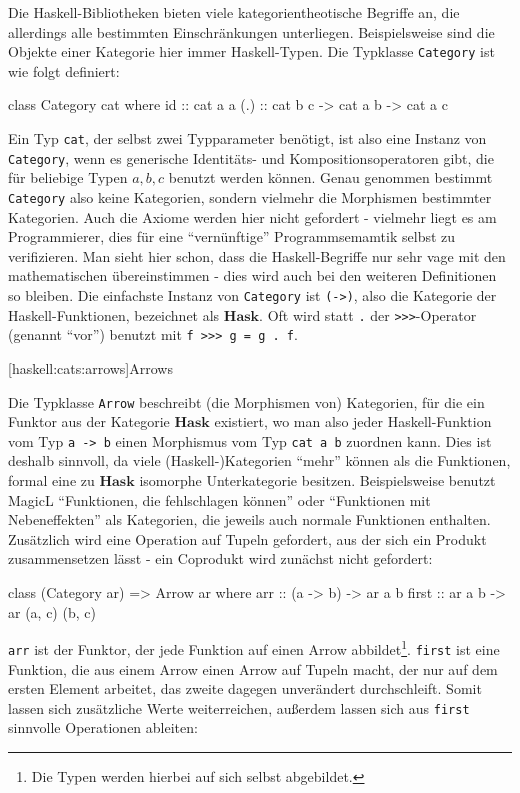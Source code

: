 \documentclass[11pt, a4paper, bibgerm]{scrbook}
\newcommand\icode[1]{\lstinline?#1?}
\newcommand\lsubsection{}
\begin{document}
Die Haskell-Bibliotheken bieten viele kategorientheotische Begriffe an,
die allerdings alle bestimmten Einschränkungen
unterliegen. Beispielsweise sind die Objekte einer Kategorie hier immer
Haskell-Typen. Die Typklasse \icode{Category} ist wie folgt definiert:
\begin{code}
class Category cat where
  id   :: cat a a
  (.)  :: cat b c -> cat a b -> cat a c
\end{code}
Ein Typ \icode{cat}, der selbst zwei Typparameter benötigt, ist also eine
Instanz von \icode{Category}, wenn es generische Identitäts- und
Kompositionsoperatoren gibt, die für beliebige Typen $a,b,c$ benutzt
werden können. Genau genommen bestimmt \icode{Category} also keine
Kategorien, sondern vielmehr die Morphismen bestimmter Kategorien. Auch
die Axiome werden hier nicht gefordert - vielmehr liegt es am
Programmierer, dies für eine "`vernünftige"' Programmsemamtik selbst zu
verifizieren. Man sieht hier schon, dass die Haskell-Begriffe nur sehr
vage mit den mathematischen übereinstimmen - dies wird auch bei den
weiteren Definitionen so bleiben. Die einfachste Instanz von
\icode{Category} ist \icode{(->)}, also die Kategorie der
Haskell-Funktionen, bezeichnet als $\mathbf{Hask}$.
Oft wird statt \icode{.} der \icode{>>>}-Operator (genannt "`vor"') %
benutzt mit \icode{f >>> g = g . f}. %

\lsubsection[haskell:cats:arrows]{Arrows}

Die Typklasse \icode{Arrow} beschreibt (die Morphismen von) Kategorien,
für die ein Funktor aus der Kategorie $\mathbf{Hask}$ existiert, wo man
also jeder Haskell-Funktion vom Typ \icode{a -> b} einen Morphismus vom
Typ \icode{cat a b} zuordnen kann. Dies ist deshalb sinnvoll, da viele
(Haskell-)Kategorien "`mehr"' können als die Funktionen, formal eine zu
$\mathbf{Hask}$ isomorphe Unterkategorie besitzen. Beispielsweise
benutzt MagicL "`Funktionen, die fehlschlagen können"' oder "`Funktionen
mit Nebeneffekten"' als Kategorien, die jeweils auch normale Funktionen
enthalten. Zusätzlich wird eine Operation auf Tupeln gefordert, aus der
sich ein Produkt zusammensetzen lässt - ein Coprodukt wird zunächst nicht gefordert:
\begin{code}
class (Category ar) => Arrow ar where
  arr   :: (a -> b) -> ar a b
  first :: ar a b  -> ar (a, c) (b, c)
\end{code}
\icode{arr} ist der Funktor, der jede Funktion auf einen Arrow
abbildet\footnote{Die Typen werden hierbei auf sich selbst abgebildet.}.
\icode{first} ist eine Funktion, die aus einem Arrow einen Arrow auf
Tupeln macht, der nur auf dem ersten Element arbeitet, das zweite
dagegen unverändert durchschleift. Somit lassen sich zusätzliche Werte
weiterreichen, außerdem lassen sich aus \icode{first} sinnvolle
Operationen ableiten:
\end{document}
